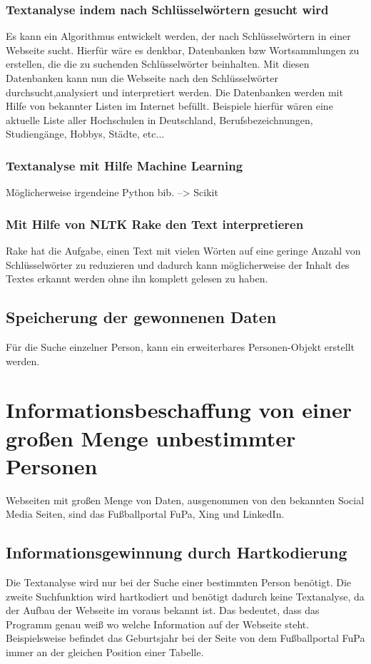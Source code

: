 		\subsubsection{Textanalyse indem nach Schlüsselwörtern gesucht wird}
		Es kann ein Algorithmus entwickelt werden, der nach Schlüsselwörtern in einer Webseite sucht. Hierfür wäre es denkbar, Datenbanken bzw Wortsammlungen zu erstellen, die die zu suchenden Schlüsselwörter beinhalten. Mit diesen Datenbanken kann nun die Webseite nach den Schlüsselwörter durchsucht,analysiert und interpretiert werden. Die Datenbanken werden mit Hilfe von bekannter Listen im Internet befüllt. Beispiele hierfür wären eine aktuelle Liste aller Hochschulen in Deutschland, Berufsbezeichnungen, Studiengänge, Hobbys, Städte, etc...
		\subsubsection{Textanalyse mit Hilfe Machine Learning}
		Möglicherweise irgendeine Python bib. -->	Scikit
		\subsubsection{Mit Hilfe von NLTK Rake den Text interpretieren}
		Rake hat die Aufgabe, einen Text mit vielen Wörten auf eine geringe Anzahl von Schlüsselwörter zu reduzieren und dadurch kann möglicherweise der Inhalt des Textes erkannt werden ohne ihn komplett gelesen zu haben.
	\subsection{Speicherung der gewonnenen Daten}
	Für die Suche einzelner Person, kann ein erweiterbares Personen-Objekt erstellt werden.
	
\section{Informationsbeschaffung von einer großen Menge unbestimmter Personen}
Webseiten mit großen Menge von Daten, ausgenommen von den bekannten Social Media Seiten, sind das Fußballportal FuPa, Xing und LinkedIn.
	\subsection{Informationsgewinnung durch Hartkodierung}
	Die Textanalyse wird nur bei der Suche einer bestimmten Person benötigt. Die  zweite Suchfunktion wird hartkodiert und benötigt dadurch keine Textanalyse, da der Aufbau der Webseite im voraus bekannt ist. Das bedeutet, dass das Programm genau weiß wo welche Information auf der Webseite steht. Beispielsweise befindet das Geburtsjahr bei der Seite von dem Fußballportal FuPa immer an der gleichen Position einer Tabelle.
